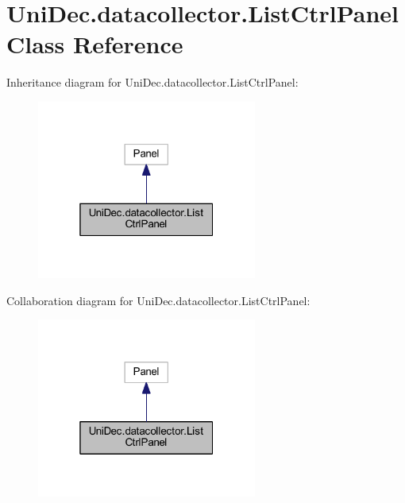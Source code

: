 \hypertarget{class_uni_dec_1_1datacollector_1_1_list_ctrl_panel}{}\section{Uni\+Dec.\+datacollector.\+List\+Ctrl\+Panel Class Reference}
\label{class_uni_dec_1_1datacollector_1_1_list_ctrl_panel}


Inheritance diagram for Uni\+Dec.\+datacollector.\+List\+Ctrl\+Panel\+:\nopagebreak
\begin{figure}[H]
\begin{center}
\leavevmode
\includegraphics[width=205pt]{class_uni_dec_1_1datacollector_1_1_list_ctrl_panel__inherit__graph}
\end{center}
\end{figure}


Collaboration diagram for Uni\+Dec.\+datacollector.\+List\+Ctrl\+Panel\+:\nopagebreak
\begin{figure}[H]
\begin{center}
\leavevmode
\includegraphics[width=205pt]{class_uni_dec_1_1datacollector_1_1_list_ctrl_panel__coll__graph}
\end{center}
\end{figure}
